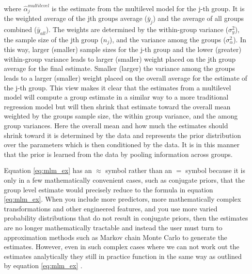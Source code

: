 where $\hat{\alpha}_j^{multilevel}$ is the estimate from the multilevel model for the j-th group. It is the weighted average of the jth groups average ($\bar{y}_j$) and the average of all groups combined ($\bar{y}_{all}$). The weights are determined by the within-group variance ($\sigma_y^2$), the sample size of the jth group ($n_j$), and the variance among the groups ($\sigma_{\alpha}^2$). In this way, larger (smaller) sample sizes for the j-th group and the lower (greater) within-group variance leads to larger (smaller) weight placed on the jth group average for the final estimate. Smaller (larger) the variance among the groups leads to a larger (smaller) weight placed on the overall average for the estimate of the j-th group. This view makes it clear that the estimates from a multilevel model will compute a group estimate in a similar way to a more traditional regression model but will then shrink that estimate toward the overall mean weighted by the groups sample size, the within group variance, and the among group variances. Here the overall mean and how much the estimates should shrink toward it is determined by the data and represents the prior distribution over the parameters which is then conditioned by the data. It is in this manner that the prior is learned from the data by pooling information across groups.

Equation \ref{eq:mlm_ex} has an $\approx$ symbol rather than an $=$ symbol because it is only in a few mathematically convenient cases, such as conjugate priors, that the group level estimate would precisely reduce to the formula in equation \ref{eq:mlm_ex}. When you include more predictors, more mathematically complex transformations and other engineered features, and you use more varied probability distributions that do not result in conjugate priors, then the estimates are no longer mathematically tractable and instead the user must turn to approximation methods such as Markov chain Monte Carlo to generate the estimates. However, even in such complex cases where we can not work out the estimates analytically they still in practice function in the same way as outlined by equation \ref{eq:mlm_ex} \cite{Gelman2006}.


